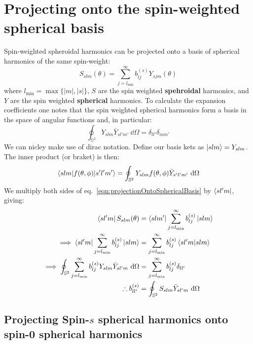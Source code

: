 \documentclass[preprint,showpacs,preprintnumbers,amssymb,superscriptaddress,aps,prd,nofootinbib,11pt]{revtex4-1}
\begin{document}
\section{Projecting onto the spin-weighted spherical basis}
Spin-weighted spheroidal harmonics can be projected onto a basis of spherical harmonics of the same spin-weight:
\begin{equation}
    S_{slm}(\theta) = \sum\limits_{j=l_\text{min}}^{\infty} b_{lj}^{(s)} Y_{sjm} (\theta) \label{eqn:projectionOntoSphericalBasis}
\end{equation}
where $l_\text{min} = \max\{|m| ,|s|\}$, $S$ are the spin weighted \textbf{spehroidal} harmonics, and $Y$  are the spin weighted \textbf{spherical} harmonics. To calculate the expansion coefficients one notes that the spin weighted spherical harmonics form a basis in the space of angular functions and, in particular:
\begin{equation}
    \oint_{\mathbb{S}^2} Y_{slm}  \bar{Y}_{s l'  m'} \ \dd \Omega = \delta_{l l'} \delta_{m m'}
\end{equation}
We can nicley make use of dirac notation. Define our basis kets as $\ket{slm} = Y_{slm}$. The inner product (or braket) is then:
\begin{equation}
    \mel{slm}{f(\theta,\phi)}{s'l'm'}= \oint_{\mathbb{S}^2} Y_{slm} f(\theta,\phi)  \bar{Y}_{s' l'  m'}\  \dd \Omega
\end{equation}
We multiply both sides of eq.~\eqref{eqn:projectionOntoSphericalBasis} by $\bra{sl'm}$, giving:
\begin{align}
    \bra{sl'm} S_{slm}(\theta) &= \bra{slm'}\sum\limits_{j=l_\text{min}}^{\infty} b_{lj}^{(s)} \ket{slm} \\
    \implies \bra{sl'm}\sum\limits_{j=l_\text{min}}^{\infty} b_{lj}^{(s)} \ket{slm} &=\sum\limits_{j=l_\text{min}}^{\infty} b_{lj}^{(s)} \braket{sl'm}{slm}\\
    \implies \oint_{\mathbb{S}^2}  \sum\limits_{j=l_\text{min}}^{\infty} b_{lj}^{(s)} Y_{slm} \bar{Y}_{s l'm} \ \dd \Omega &= \sum\limits_{j=l_\text{min}}^{\infty} b_{lj}^{(s)} \delta_{ll'}\\
    \therefore b_{ll'}^{(s)} &= \oint_{\mathbb{S}^2} S_{slm} \bar{Y}_{sl'm} \ \dd \Omega 
\end{align}
\subsection{Projecting Spin-$s$ spherical harmonics onto spin-0 spherical harmonics}



\end{document}
